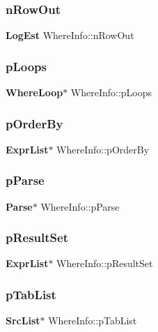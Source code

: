 \subsubsection{nRowOut}
{\footnotesize\ttfamily \textbf{ Log\+Est} Where\+Info\+::n\+Row\+Out}

\mbox{\label{struct_where_info_a98f12794aec775d30b51d9cbdec90801}} 
\subsubsection{pLoops}
{\footnotesize\ttfamily \textbf{ Where\+Loop}$\ast$ Where\+Info\+::p\+Loops}

\mbox{\label{struct_where_info_a7d15fd39a32b8324e03b1c0b1db991a2}} 
\subsubsection{pOrderBy}
{\footnotesize\ttfamily \textbf{ Expr\+List}$\ast$ Where\+Info\+::p\+Order\+By}

\mbox{\label{struct_where_info_a26745055cd13360536fb4b074db358f9}} 
\subsubsection{pParse}
{\footnotesize\ttfamily \textbf{ Parse}$\ast$ Where\+Info\+::p\+Parse}

\mbox{\label{struct_where_info_ad480304ebeadcad7cb742dd8d8e11a0b}} 
\subsubsection{pResultSet}
{\footnotesize\ttfamily \textbf{ Expr\+List}$\ast$ Where\+Info\+::p\+Result\+Set}

\mbox{\label{struct_where_info_a0f43432aeca75640c96a69f6a82aa138}} 
\subsubsection{pTabList}
{\footnotesize\ttfamily \textbf{ Src\+List}$\ast$ Where\+Info\+::p\+Tab\+List}

